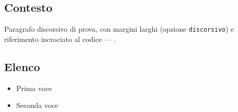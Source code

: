 \subsection*{Contesto}
Paragrafo discorsivo di prova, con margini larghi (opzione
\texttt{discorsivo}) e riferimento incrociato al codice 
--- .

\subsection*{Elenco}
\begin{itemize}
    \item Prima voce
    \item Seconda voce
\end{itemize}
